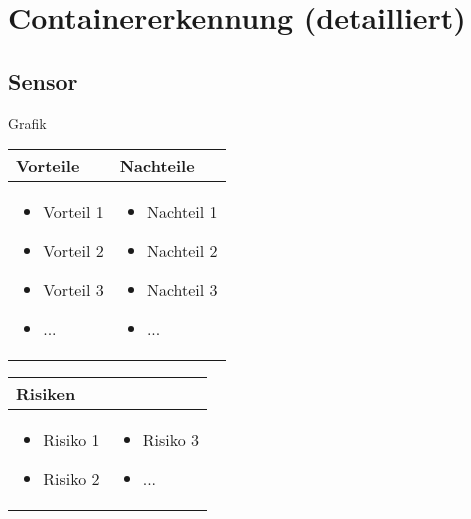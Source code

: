 
\section{Containererkennung (detailliert)}


\subsection{Sensor}

Grafik

\begin{table}[h]
\begin{tabular}{p{} | p{}}


 \textbf{Vorteile} & \textbf{Nachteile} \\ \hline
	 
\begin{itemize}
\item Vorteil 1
\item Vorteil 2
\item Vorteil 3
\item ...
\end{itemize}

 
 &
 
\begin{itemize}
\item Nachteil 1
\item Nachteil 2
\item Nachteil 3
\item ...
\end{itemize}

\end{tabular}
\end{table}

\begin{table}[h]
\begin{tabular}{p{}p{}}


 \textbf{Risiken} & \\ \hline
	 
\begin{itemize}
\item Risiko 1
\item Risiko 2
\end{itemize}
&
\begin{itemize}
\item Risiko 3
\item ...
\end{itemize}

 
\end{tabular}
\end{table}

